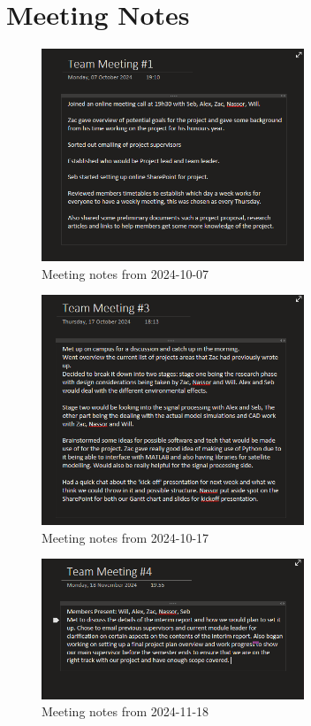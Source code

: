 \section{Meeting Notes}

\begin{figure}[htbp]
    \centering
    \includegraphics[width=0.7\textwidth]{figures/Appendix-MeetingNotes/meeting_note_1.png}
    \caption*{Meeting notes from 2024-10-07} 
    \label{fig:meeting1}
    \end{figure}

    \begin{figure}[htbp]
        \centering
        \includegraphics[width=0.7\textwidth]{figures/Appendix-MeetingNotes/meeting_note_3.png}
        \caption*{Meeting notes from 2024-10-17} 
        \label{fig:meeting3}
        \end{figure}

        \begin{figure}[htbp]
            \centering
            \includegraphics[width=0.7\textwidth]{figures/Appendix-MeetingNotes/meetingnote4.png}
            \caption*{Meeting notes from 2024-11-18} 
            \label{fig:meeting4}
            \end{figure}

